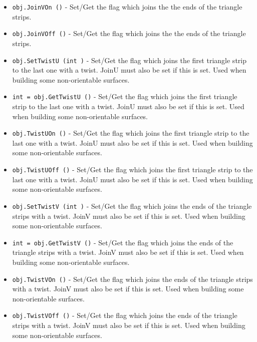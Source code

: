 \begin{itemize}
\item  \verb|obj.JoinVOn ()| -  Set/Get the flag which joins the the ends of the triangle strips.

\item  \verb|obj.JoinVOff ()| -  Set/Get the flag which joins the the ends of the triangle strips.

\item  \verb|obj.SetTwistU (int )| -  Set/Get the flag which joins the first triangle strip to 
 the last one with a twist.
 JoinU must also be set if this is set. Used when building
 some non-orientable surfaces.

\item  \verb|int = obj.GetTwistU ()| -  Set/Get the flag which joins the first triangle strip to 
 the last one with a twist.
 JoinU must also be set if this is set. Used when building
 some non-orientable surfaces.

\item  \verb|obj.TwistUOn ()| -  Set/Get the flag which joins the first triangle strip to 
 the last one with a twist.
 JoinU must also be set if this is set. Used when building
 some non-orientable surfaces.

\item  \verb|obj.TwistUOff ()| -  Set/Get the flag which joins the first triangle strip to 
 the last one with a twist.
 JoinU must also be set if this is set. Used when building
 some non-orientable surfaces.

\item  \verb|obj.SetTwistV (int )| -  Set/Get the flag which joins the ends of the 
 triangle strips with a twist.
 JoinV must also be set if this is set. Used when building
 some non-orientable surfaces.

\item  \verb|int = obj.GetTwistV ()| -  Set/Get the flag which joins the ends of the 
 triangle strips with a twist.
 JoinV must also be set if this is set. Used when building
 some non-orientable surfaces.

\item  \verb|obj.TwistVOn ()| -  Set/Get the flag which joins the ends of the 
 triangle strips with a twist.
 JoinV must also be set if this is set. Used when building
 some non-orientable surfaces.

\item  \verb|obj.TwistVOff ()| -  Set/Get the flag which joins the ends of the 
 triangle strips with a twist.
 JoinV must also be set if this is set. Used when building
 some non-orientable surfaces.


\end{itemize}
